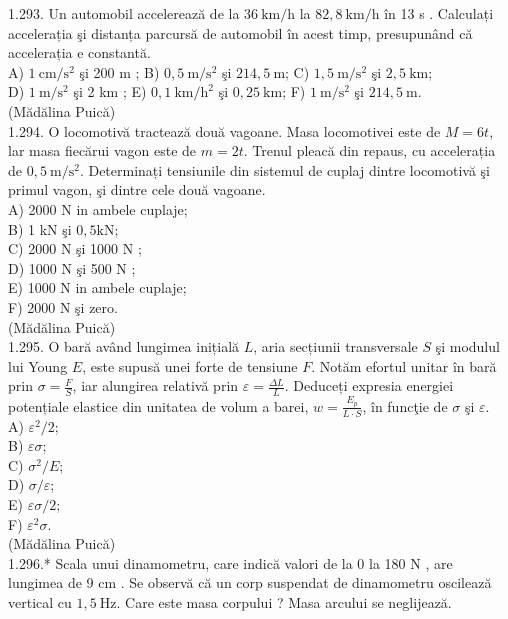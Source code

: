 {1.293. Un automobil accelerează de la $36 \mathrm{~km} / \mathrm{h}$ la $82,8 \mathrm{~km} / \mathrm{h}$ în 13 s . Calculați accelerația şi distanța parcursă de automobil în acest timp, presupunând că accelerația e constantă.\\
A) $1 \mathrm{~cm} / \mathrm{s}^{2}$ şi 200 m ; B) $0,5 \mathrm{~m} / \mathrm{s}^{2}$ şi $214,5 \mathrm{~m}$; C) $1,5 \mathrm{~m} / \mathrm{s}^{2}$ şi $2,5 \mathrm{~km}$;\\
D) $1 \mathrm{~m} / \mathrm{s}^{2}$ şi 2 km ; E) $0,1 \mathrm{~km} / \mathrm{h}^{2}$ şi $0,25 \mathrm{~km}$; F) $1 \mathrm{~m} / \mathrm{s}^{2}$ şi $214,5 \mathrm{~m}$.\\
(Mădălina Puică)\\
1.294. O locomotivă tractează două vagoane. Masa locomotivei este de $M=6 t$, lar masa fiecărui vagon este de $m=2 t$. Trenul pleacă din repaus, cu accelerația de $0,5 \mathrm{~m} / \mathrm{s}^{2}$. Determinați tensiunile din sistemul de cuplaj dintre locomotivă şi primul vagon, şi dintre cele două vagoane.\\
A) 2000 N in ambele cuplaje;\\
B) 1 kN şi $0,5 \mathrm{kN}$;\\
C) 2000 N şi 1000 N ;\\
D) 1000 N şi 500 N ;\\
E) 1000 N in ambele cuplaje;\\
F) 2000 N şi zero.\\
(Mădălina Puică)\\
1.295. O bară având lungimea inițială $L$, aria secțiunii transversale $S$ şi modulul lui Young $E$, este supusă unei forte de tensiune $F$. Notăm efortul unitar în bară prin $\sigma=\frac{F}{S}$, iar alungirea relativă prin $\varepsilon=\frac{\Delta L}{L}$. Deduceți expresia energiei potențiale elastice din unitatea de volum a barei, $w=\frac{E_{p}}{L \cdot S}$, în funcţie de $\sigma$ şi $\varepsilon$.\\
A) $\varepsilon^{2} / 2$;\\
B) $\varepsilon \sigma$;\\
C) $\sigma^{2} / E$;\\
D) $\sigma / \varepsilon$;\\
E) $\varepsilon \sigma / 2$;\\
F) $\varepsilon^{2} \sigma$.\\
(Mădălina Puică)\\
1.296.* Scala unui dinamometru, care indică valori de la 0 la 180 N , are lungimea de 9 cm . Se observă că un corp suspendat de dinamometru oscilează vertical cu $1,5 \mathrm{~Hz}$. Care este masa corpului ? Masa arcului se neglijează.\\
}
